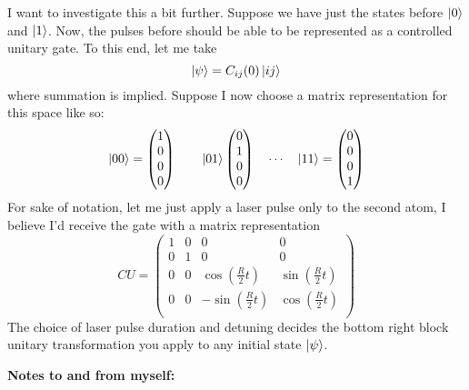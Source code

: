 \documentclass[12pt]{article} %
\begin{document}
\newpage
I want to investigate this a bit further. Suppose we have just the states before $\ket{0}$ and $\ket{1}$. Now, the pulses before should be able to be represented as a controlled unitary gate. To this end, let me take 
\begin{equation}
\ket{\psi} = C_{ij}(0) \ket{ij}
\end{equation}
where summation is implied. Suppose I now choose a matrix representation for this space like so:
\begin{equation}
\ket{00} = \begin{pmatrix} 1 \\ 0 \\ 0 \\ 0 \end{pmatrix} \qquad \ket{01} \begin{pmatrix} 0 \\ 1 \\ 0 \\ 0 \end{pmatrix} \quad \cdots \quad \ket{11} = \begin{pmatrix} 0 \\ 0 \\ 0 \\ 1 \end{pmatrix}
\end{equation}
For sake of notation, let me just apply a laser pulse only to the second atom, I believe I'd receive the gate with a matrix representation
\begin{equation}
CU = \begin{pmatrix} 					1 & 0 & 0 & 0 \\
					0 & 1 & 0 & 0\\
					 0 & 0 & \cos\left(\frac{R}{2} t\right) & \sin\left(\frac{R}{2} t\right)\\
					 0 & 0 & -\sin\left(\frac{R}{2} t\right) & \cos\left(\frac{R}{2} t\right)\\
 \end{pmatrix}
\end{equation}
The choice of laser pulse duration and detuning decides the bottom right block unitary transformation you apply to any initial state $\ket{\psi}$. 

\newpage
\noindent\textbf{Notes to and from myself:}
\end{document}
